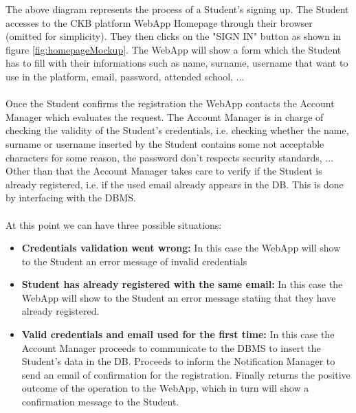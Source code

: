 \documentclass{article}
\begin{document}
{        The above diagram represents the process of a Student's signing up.
        The Student accesses to the CKB platform WebApp Homepage through their browser
        (omitted for simplicity). They then clicks on the "SIGN IN" button as
        shown in figure \ref{fig:homepageMockup}. The WebApp will show a form
        which the Student has to fill with their informations such as
        name, surname, username that want to use in the platform, email,
        password, attended school, ... 
        \\ \\
        Once the Student confirms the registration the WebApp contacts the
        Account Manager which evaluates the request.
        The Account Manager is in charge of checking the validity of the Student's credentials,
        i.e. checking whether the name, surname or username inserted by the Student
        contains some not acceptable characters for some reason, the password
        don't respects security standards, ... \\
        Other than that the Account Manager takes care to verify if the Student is already
        registered, i.e. if the used email already appears in the DB. This is done by interfacing
        with the DBMS.
        \\ \\
        At this point we can have three possible situations:
        \begin{itemize}
            \item \textbf{Credentials validation went wrong:} In this case the WebApp will show to the
            Student an error message of invalid credentials
            \item \textbf{Student has already registered with the same email:} In this case the WebApp will show to the
            Student an error message stating that they have already registered.
            \item \textbf{Valid credentials and email used for the first time:} In this case the Account
            Manager proceeds to communicate to the DBMS to insert the Student's data in the DB.
            Proceeds to inform the Notification Manager to send an email of confirmation for the registration.
            Finally returns the positive outcome of the operation to the WebApp, which in 
            turn will show a confirmation message to the Student.
        \end{itemize}

}
\end{document}
